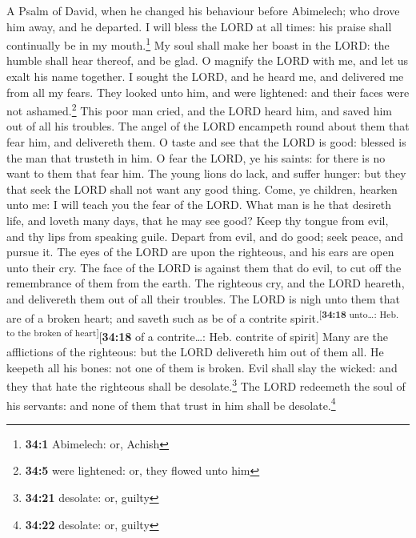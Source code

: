 A Psalm of David, when he changed his behaviour before Abimelech; who
drove him away, and he departed.  I will bless the LORD at
all times: his praise shall continually be in my mouth.\footnote{\textbf{34:1}
  Abimelech: or, Achish}  My soul shall make her boast in
the LORD: the humble shall hear thereof, and be glad.  O
magnify the LORD with me, and let us exalt his name together.
 I sought the LORD, and he heard me, and delivered me from
all my fears.  They looked unto him, and were lightened:
and their faces were not ashamed.\footnote{\textbf{34:5} were lightened:
  or, they flowed unto him}  This poor man cried, and the
LORD heard him, and saved him out of all his troubles. 
The angel of the LORD encampeth round about them that fear him, and
delivereth them.  O taste and see that the LORD is good:
blessed is the man that trusteth in him.  O fear the LORD,
ye his saints: for there is no want to them that fear him.
 The young lions do lack, and suffer hunger: but they
that seek the LORD shall not want any good thing.  Come,
ye children, hearken unto me: I will teach you the fear of the LORD.
 What man is he that desireth life, and loveth many days,
that he may see good?  Keep thy tongue from evil, and thy
lips from speaking guile.  Depart from evil, and do good;
seek peace, and pursue it.  The eyes of the LORD are upon
the righteous, and his ears are open unto their cry.  The
face of the LORD is against them that do evil, to cut off the
remembrance of them from the earth.  The righteous cry,
and the LORD heareth, and delivereth them out of all their troubles.
 The LORD is nigh unto them that are of a broken heart;
and saveth such as be of a contrite
spirit.\textsuperscript{{[}\textbf{34:18} unto\ldots: Heb. to the broken
of heart{]}}{[}\textbf{34:18} of a contrite\ldots: Heb. contrite of
spirit{]}  Many are the afflictions of the righteous: but
the LORD delivereth him out of them all.  He keepeth all
his bones: not one of them is broken.  Evil shall slay
the wicked: and they that hate the righteous shall be
desolate.\footnote{\textbf{34:21} desolate: or, guilty} 
The LORD redeemeth the soul of his servants: and none of them that trust
in him shall be desolate.\footnote{\textbf{34:22} desolate: or, guilty}

